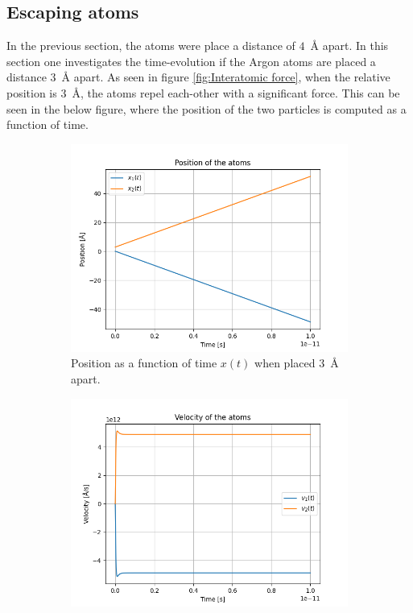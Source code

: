 \documentclass[a4paper]{article}
\begin{document}
\subsection{Escaping atoms}
In the previous section, the atoms were place a distance of $4$~Å apart. In this section one investigates the time-evolution if the Argon atoms are placed a distance $3$~Å apart.
As seen in figure \ref{fig:Interatomic force}, when the relative position is $3$~Å, the atoms repel each-other with a significant force. This can be seen in the below figure, where the position of the two particles is computed as a function of time.
\begin{figure}[H]
    \centering
    \begin{subfigure}[b]{0.45\textwidth}
        \centering
        \includegraphics[width=\textwidth]{position_close.png}
        \caption{Position as a function of time $x(t)$ when placed $3$~Å apart.}
        \label{fig: close position}
    \end{subfigure}
    \hfill
    \begin{subfigure}[b]{0.45\textwidth}
        \centering
        \includegraphics[width=\textwidth]{velocity_close.png}

\end{subfigure}
\end{figure}
\end{document}
